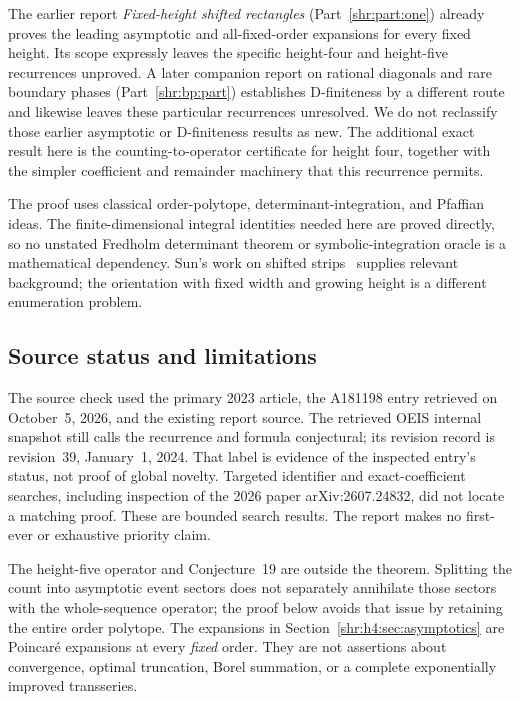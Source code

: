\documentclass[11pt,letterpaper]{article}
\numberwithin{equation}{section}
\theoremstyle{definition}
\newcommand{\1}{\mathbf 1}
\begin{document}
The earlier report \emph{Fixed-height shifted rectangles}
(Part~\ref{shr:part:one}) already proves the leading asymptotic and all-fixed-order
expansions for every fixed height. Its scope expressly leaves the specific
height-four and height-five recurrences unproved. A later companion report
on rational diagonals and rare boundary phases (Part~\ref{shr:bp:part}) establishes
D-finiteness by a different route and likewise leaves these particular
recurrences unresolved. We do not reclassify those earlier asymptotic or
D-finiteness results as new. The additional exact result here is the
counting-to-operator certificate for height four, together with the
simpler coefficient and remainder machinery that this recurrence permits.

The proof uses classical order-polytope, determinant-integration, and
Pfaffian ideas. The finite-dimensional integral identities needed here are
proved directly, so no unstated Fredholm determinant theorem or
symbolic-integration oracle is a mathematical dependency. Sun's work on
shifted strips~\cite{Sun} supplies relevant background; the orientation
with fixed width and growing height is a different enumeration problem.

\subsection{Source status and limitations}
The source check used the primary 2023 article, the A181198 entry retrieved
on October~5, 2026, and the existing report source. The retrieved OEIS
internal snapshot still calls the recurrence and formula conjectural; its
revision record is revision~39, January~1, 2024. That label is evidence of
the inspected entry's status, not proof of global novelty. Targeted
identifier and exact-coefficient searches, including inspection of the
2026 paper arXiv:2607.24832, did not locate a matching proof. These are
bounded search results. The report makes no first-ever or exhaustive
priority claim.

The height-five operator and Conjecture~19 are outside the theorem.
Splitting the count into asymptotic event sectors does not separately
annihilate those sectors with the whole-sequence operator; the proof below
avoids that issue by retaining the entire order polytope. The expansions
in Section~\ref{shr:h4:sec:asymptotics} are Poincar\'e expansions at every
\emph{fixed} order. They are not assertions about convergence, optimal
truncation, Borel summation, or a complete exponentially improved
transseries.
\end{document}
